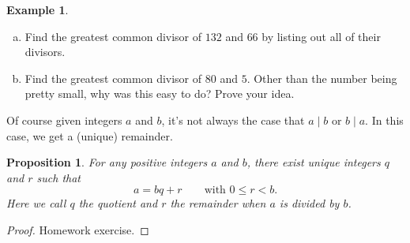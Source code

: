 \documentclass[12pt]{article}
\theoremstyle{plain}
\newtheorem{proposition}[theorem]{Proposition}
\theoremstyle{definition}
\newtheorem{example}[theorem]{Example}
\theoremstyle{remark}
\begin{document}
\begin{example}
    \begin{enumerate}[(a)]
        \item Find the greatest common divisor of $132$ and $66$ by listing out all of their divisors.

        \item Find the greatest common divisor of $80$ and $5$. Other than the number being pretty small, why was this easy to do? Prove your idea.
    \end{enumerate}
\end{example}

Of course given integers $a$ and $b$, it's not always the case that $a\mid b$ or $b\mid a$.
In this case, we get a (unique) remainder.

\begin{proposition}
    For any positive integers $a$ and $b$, there exist unique integers $q$ and $r$ such that
    \begin{equation}\label{division}
        a = bq + r\qquad \text{with }0\leq r < b.
    \end{equation}
    Here we call $q$ the \emph{quotient} and $r$ the \emph{remainder} when $a$ is divided by $b$.
\end{proposition}
\begin{proof}
    Homework exercise.
\end{proof}
\end{document}
